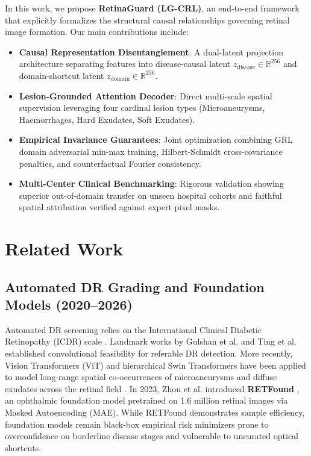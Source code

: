 \documentclass[journal,compsoc]{IEEEtran}
\begin{document}
In this work, we propose \textbf{RetinaGuard (LG-CRL)}, an end-to-end framework that explicitly formalizes the structural causal relationships governing retinal image formation. Our main contributions include:
\begin{itemize}
    \item \textbf{Causal Representation Disentanglement}: A dual-latent projection architecture separating features into disease-causal latent $z_{\text{disease}} \in \mathbb{R}^{256}$ and domain-shortcut latent $z_{\text{domain}} \in \mathbb{R}^{256}$.
    \item \textbf{Lesion-Grounded Attention Decoder}: Direct multi-scale spatial supervision leveraging four cardinal lesion types (Microaneurysms, Haemorrhages, Hard Exudates, Soft Exudates).
    \item \textbf{Empirical Invariance Guarantees}: Joint optimization combining GRL domain adversarial min-max training, Hilbert-Schmidt cross-covariance penalties, and counterfactual Fourier consistency.
    \item \textbf{Multi-Center Clinical Benchmarking}: Rigorous validation showing superior out-of-domain transfer on unseen hospital cohorts and faithful spatial attribution verified against expert pixel masks.
\end{itemize}

\section{Related Work}
\subsection{Automated DR Grading and Foundation Models (2020--2026)}
Automated DR screening relies on the International Clinical Diabetic Retinopathy (ICDR) scale \cite{wilkinson2003proposed}. Landmark works by Gulshan et al. \cite{gulshan2016development} and Ting et al. established convolutional feasibility for referable DR detection. More recently, Vision Transformers (ViT) and hierarchical Swin Transformers have been applied to model long-range spatial co-occurrences of microaneurysms and diffuse exudates across the retinal field \cite{dai2021vision, sun2022lesion}. In 2023, Zhou et al. introduced \textbf{RETFound} \cite{zhou2023foundation}, an ophthalmic foundation model pretrained on 1.6 million retinal images via Masked Autoencoding (MAE). While RETFound demonstrates sample efficiency, foundation models remain black-box empirical risk minimizers prone to overconfidence on borderline disease stages and vulnerable to uncurated optical shortcuts.
\end{document}
